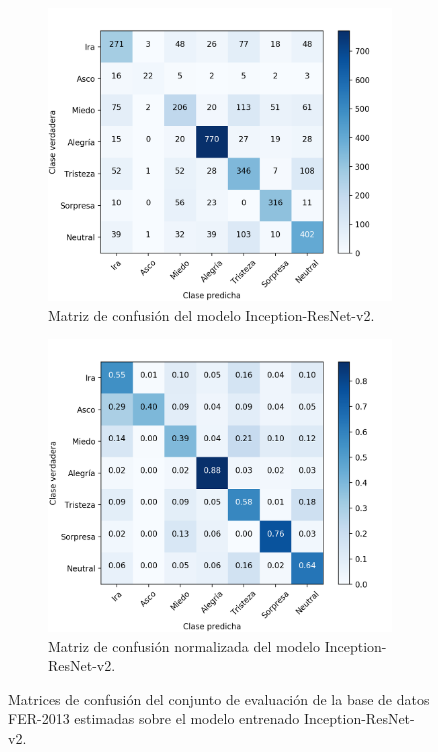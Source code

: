 \begin{figure}
    \centering
    \begin{subfigure}[t]{\textwidth}
      \centering
      \includegraphics[width=0.7\linewidth]{Images/Inception-ResNet-v2_matrix.png}
      \caption{Matriz de confusión del modelo Inception-ResNet-v2.}
      \label{fig:Inception-ResNet-v2_matrix}
    \end{subfigure}
    
    \vspace{1cm}
    \begin{subfigure}[t]{\textwidth}
      \centering
      \includegraphics[width=0.7\linewidth]{Images/Inception-ResNet-v2_matrix_norm.png}
      \caption{Matriz de confusión normalizada del modelo Inception-ResNet-v2.}
      \label{fig:Inception-ResNet-v2_matrix_norm}
    \end{subfigure}
    \caption{Matrices de confusión del conjunto de evaluación de la base de datos FER-2013 estimadas sobre el modelo entrenado Inception-ResNet-v2.}
    \label{fig:Inception-ResNet-v2_matrices}
\end{figure}

